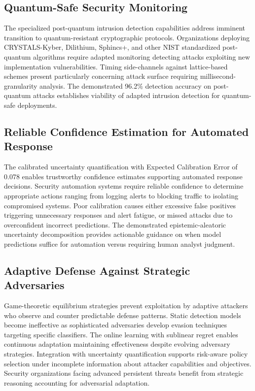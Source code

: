 \subsection*{Quantum-Safe Security Monitoring}

The specialized post-quantum intrusion detection capabilities address imminent transition to quantum-resistant cryptographic protocols. Organizations deploying CRYSTALS-Kyber, Dilithium, Sphincs+, and other NIST standardized post-quantum algorithms require adapted monitoring detecting attacks exploiting new implementation vulnerabilities. Timing side-channels against lattice-based schemes present particularly concerning attack surface requiring millisecond-granularity analysis. The demonstrated 96.2\% detection accuracy on post-quantum attacks establishes viability of adapted intrusion detection for quantum-safe deployments.

\subsection*{Reliable Confidence Estimation for Automated Response}

The calibrated uncertainty quantification with Expected Calibration Error of 0.078 enables trustworthy confidence estimates supporting automated response decisions. Security automation systems require reliable confidence to determine appropriate actions ranging from logging alerts to blocking traffic to isolating compromised systems. Poor calibration causes either excessive false positives triggering unnecessary responses and alert fatigue, or missed attacks due to overconfident incorrect predictions. The demonstrated epistemic-aleatoric uncertainty decomposition provides actionable guidance on when model predictions suffice for automation versus requiring human analyst judgment.

\subsection*{Adaptive Defense Against Strategic Adversaries}

Game-theoretic equilibrium strategies prevent exploitation by adaptive attackers who observe and counter predictable defense patterns. Static detection models become ineffective as sophisticated adversaries develop evasion techniques targeting specific classifiers. The online learning with sublinear regret enables continuous adaptation maintaining effectiveness despite evolving adversary strategies. Integration with uncertainty quantification supports risk-aware policy selection under incomplete information about attacker capabilities and objectives. Security organizations facing advanced persistent threats benefit from strategic reasoning accounting for adversarial adaptation.

